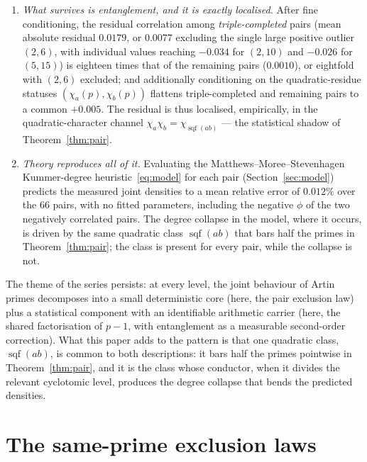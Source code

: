 \documentclass[11pt,reqno]{amsart}
\theoremstyle{plain}
\theoremstyle{definition}
\DeclareMathOperator{\sqf}{sqf}
\begin{document}
\begin{enumerate}
    simultaneously. This common-cause structure, not any interaction between
    the bases, is the bulk of the correlation.
  \item \emph{What survives is entanglement, and it is exactly localised.}
    After fine conditioning, the residual correlation among \emph{triple-completed} pairs (mean absolute residual $0.0179$, or $0.0077$
    excluding the single large positive outlier $(2,6)$, with individual values
    reaching $-0.034$ for $(2,10)$ and $-0.026$ for $(5,15)$) is eighteen times that of the remaining pairs ($0.0010$), or eightfold with $(2,6)$ excluded;
    and additionally conditioning on the quadratic-residue statuses
    $(\chi_a(p), \chi_b(p))$ flattens triple-completed and remaining pairs to a common $+0.005$. The residual is thus localised, empirically, in the quadratic-character channel $\chi_a \chi_b = \chi_{\sqf(ab)}$ --- the
    statistical shadow of Theorem~\ref{thm:pair}.
  \item \emph{Theory reproduces all of it.} Evaluating the Matthews--Moree--Stevenhagen
    Kummer-degree heuristic~\eqref{eq:model} for each pair
    (Section~\ref{sec:model}) predicts the measured joint densities to a mean
    relative error of $0.012\%$ over the $66$ pairs, with no fitted
    parameters, including the negative $\phi$ of the two negatively correlated pairs. The degree collapse in the model, where it occurs, is driven by the same quadratic class $\sqf(ab)$ that bars half the primes in Theorem~\ref{thm:pair}; the class is present for every pair, while the collapse is not.
\end{enumerate}

The theme of the series persists: at every level, the joint behaviour of
Artin primes decomposes into a small deterministic core (here, the pair
exclusion law) plus a statistical component with an identifiable arithmetic
carrier (here, the shared factorisation of $p-1$, with entanglement as a
measurable second-order correction). What this paper adds to the pattern is that one quadratic class, $\sqf(ab)$, is common to both descriptions: it bars half the primes pointwise in Theorem~\ref{thm:pair}, and it is the class whose conductor, when it divides the relevant cyclotomic level, produces the degree collapse that bends the predicted densities.

\section{The same-prime exclusion laws}
\label{sec:theorem}
\end{document}
